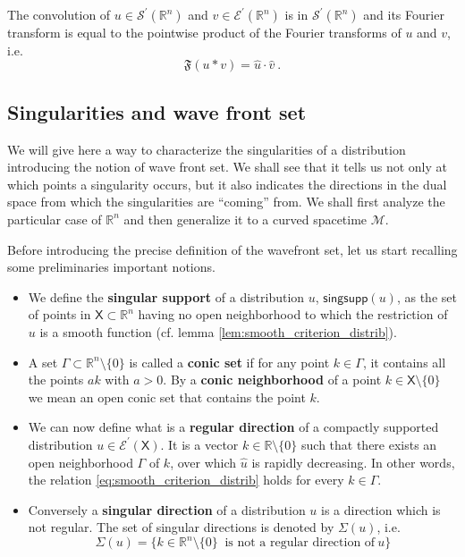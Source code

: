 \documentclass[11pt]{book}
\newcommand{\singsupp}{\mathsf{singsupp}}
\newcommand{\Ecal}{\mathcal{E}}
\newcommand{\Mcal}{\mathcal{M}}
\newcommand{\Scal}{\mathcal{S}}
\newcommand{\Rbb}{\mathbb{R}}
\newcommand{\Frak}{\mathfrak{F}}
\newcommand{\Xsf}{\mathsf{X}}
\theoremstyle{break}
\begin{document}
The convolution of $u \in \Scal^\prime(\Rbb^n)$ and $v\in \Ecal^\prime(\Rbb^n)$ is in $\Scal^\prime(\Rbb^n)$ and its Fourier transform is equal to the pointwise product of the Fourier transforms of $u$ and $v$, i.e.
%
\begin{equation*}
\Frak(u \ast v) = \hat{u} \cdot \hat{v} \ .
\end{equation*}
%


\subsection{Singularities and wave front set}
\label{p:SING_WF}


We will give here a way to characterize the singularities of a distribution introducing the notion of wave front set. We shall see that it tells us not only at which points a singularity occurs, but it also indicates the directions in the dual space from which the singularities are ``coming'' from. We shall first analyze the particular case of $\Rbb^n$ and then generalize it to a curved spacetime $\Mcal$. 


Before introducing the precise definition of the wavefront set, let us start recalling some preliminaries important notions.


\begin{itemize}
\setlength\itemsep{0pt}
%
%
%
%
\item We define the \textbf{singular support} of a distribution $u$, $\singsupp(u)$, as the set of points in $\Xsf \subset \Rbb^n$ having no open neighborhood to which the restriction of $u$ is a smooth function (cf. lemma \ref{lem:smooth_criterion_distrib}). 
%
%
%
%
\item A set $\Gamma \subset \Rbb^n \setminus \{0\}$ is called a \textbf{conic set} if for any point $k \in \Gamma$, it contains all the points $a k$ with $a > 0$. By a \textbf{conic neighborhood} of a point $k \in \Xsf \setminus \{0\}$ we mean an open conic set that contains the point $k$. 
%
%
%
%
\item We can now define what is a \textbf{regular direction} of a compactly supported distribution $u\in\Ecal^\prime(\Xsf)$. It is a vector $k \in \Rbb\setminus\{0\}$ such that there exists an open neighborhood $\Gamma$ of $k$, over which $\hat{u}$ is rapidly decreasing. In other words, the relation \eqref{eq:smooth_criterion_distrib} holds for every $k \in \Gamma$.\par%
%
\item Conversely a \textbf{singular direction} of a distribution $u$ is a direction which is not regular. The set of singular directions is denoted by $\Sigma (u)$, i.e.
%
\begin{equation}
\Sigma(u) = \bigg\{ k \in \Rbb^n \setminus \{0\} \ \mbox{ is not a regular direction of} \ u  \bigg\} 
\label{eq:sing_direction}
\end{equation}
%
%
%
%
\end{itemize}
\end{document}
